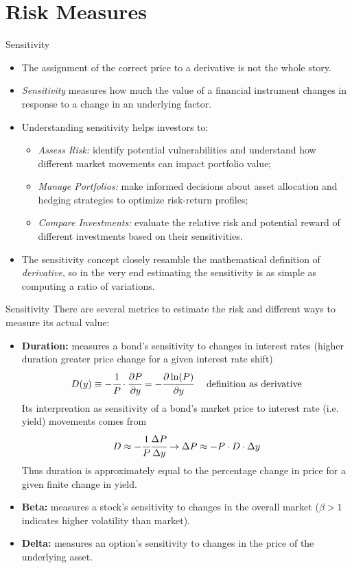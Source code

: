 \documentclass{beamer}
\begin{document}
\section{Risk Measures}
\begin{frame}{Sensitivity}
\begin{itemize}
\item The assignment of the correct price to a derivative is not the whole story.
\item \emph{Sensitivity} measures how much the value of a financial instrument changes in response to a change in an underlying factor.  
\item Understanding sensitivity helps investors to:
\begin{itemize}
    \item \emph{Assess Risk:} identify potential vulnerabilities and understand how different market movements can impact portfolio value;
    \item \emph{Manage Portfolios:} make informed decisions about asset allocation and hedging strategies to optimize risk-return profiles;
    \item \emph{Compare Investments:} evaluate the relative risk and potential reward of different investments based on their sensitivities.
\end{itemize}
\item The sensitivity concept closely resamble the mathematical definition of \emph{derivative}, so in the very end estimating the sensitivity is as simple as computing a ratio of variations.
\end{itemize}
\end{frame}

\begin{frame}{Sensitivity}
There are several metrics to estimate the risk and different ways to measure its actual value:
\begin{itemize}
\item \textbf{Duration:} measures a bond's sensitivity to changes in interest rates (higher duration greater price change for a given interest rate shift)
\begin{equation*}
D(y)\equiv -\cfrac{1}{P}\cdot \cfrac{\partial P}{\partial y}=-\cfrac {\partial \ln(P)}{\partial y}\quad\text{ definition as derivative}
\end{equation*}
Its interpreation as sensitivity of a bond's market price to interest rate (i.e. yield) movements comes from
\begin{equation*}
D\approx -\cfrac {1}{P}\cfrac{\Delta P}{\Delta y}\rightarrow \Delta P\approx -P\cdot D\cdot \Delta y
\end{equation*}
Thus duration is approximately equal to the percentage change in price for a given finite change in yield.
\item \textbf{Beta:} measures a stock's sensitivity to changes in the overall market ($\beta > 1$ indicates higher volatility than market).
\item \textbf{Delta:} measures an option's sensitivity to changes in the price of the underlying asset.
\end{itemize}
\end{frame}
\end{document}
